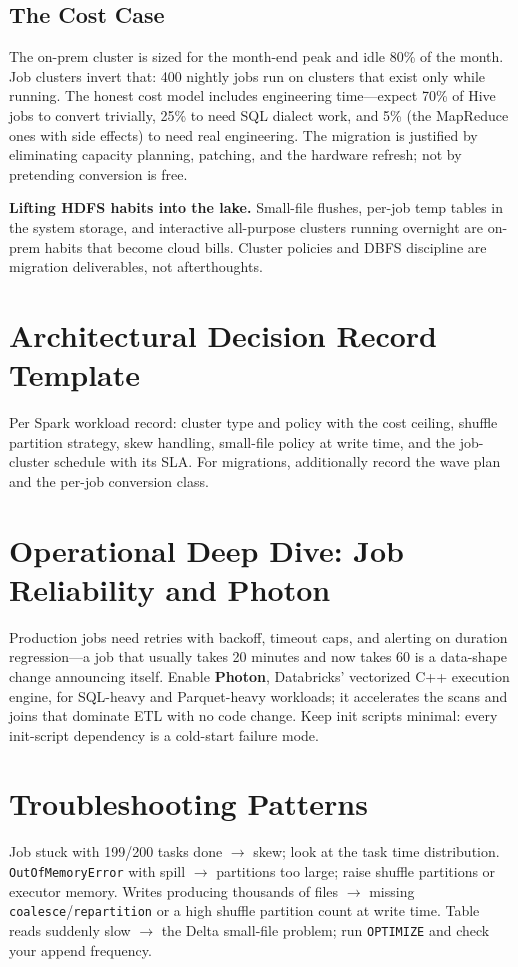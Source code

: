 \subsection{The Cost Case}
The on-prem cluster is sized for the month-end peak and idle 80\% of the month. Job clusters invert that: 400 nightly jobs run on clusters that exist only while running. The honest cost model includes engineering time---expect 70\% of Hive jobs to convert trivially, 25\% to need SQL dialect work, and 5\% (the MapReduce ones with side effects) to need real engineering. The migration is justified by eliminating capacity planning, patching, and the hardware refresh; not by pretending conversion is free.

\begin{pitfall}
\textbf{Lifting HDFS habits into the lake.} Small-file flushes, per-job temp tables in the system storage, and interactive all-purpose clusters running overnight are on-prem habits that become cloud bills. Cluster policies and DBFS discipline are migration deliverables, not afterthoughts.
\end{pitfall}

\section{Architectural Decision Record Template}
Per Spark workload record: cluster type and policy with the cost ceiling, shuffle partition strategy, skew handling, small-file policy at write time, and the job-cluster schedule with its SLA. For migrations, additionally record the wave plan and the per-job conversion class.

\section{Operational Deep Dive: Job Reliability and Photon}
Production jobs need retries with backoff, timeout caps, and alerting on duration regression---a job that usually takes 20 minutes and now takes 60 is a data-shape change announcing itself. Enable \textbf{Photon}, Databricks' vectorized C++ execution engine, for SQL-heavy and Parquet-heavy workloads; it accelerates the scans and joins that dominate ETL with no code change. Keep init scripts minimal: every init-script dependency is a cold-start failure mode.

\section{Troubleshooting Patterns}
Job stuck with 199/200 tasks done $\rightarrow$ skew; look at the task time distribution. \texttt{OutOfMemoryError} with spill $\rightarrow$ partitions too large; raise shuffle partitions or executor memory. Writes producing thousands of files $\rightarrow$ missing \texttt{coalesce}/\texttt{repartition} or a high shuffle partition count at write time. Table reads suddenly slow $\rightarrow$ the Delta small-file problem; run \texttt{OPTIMIZE} and check your append frequency.

